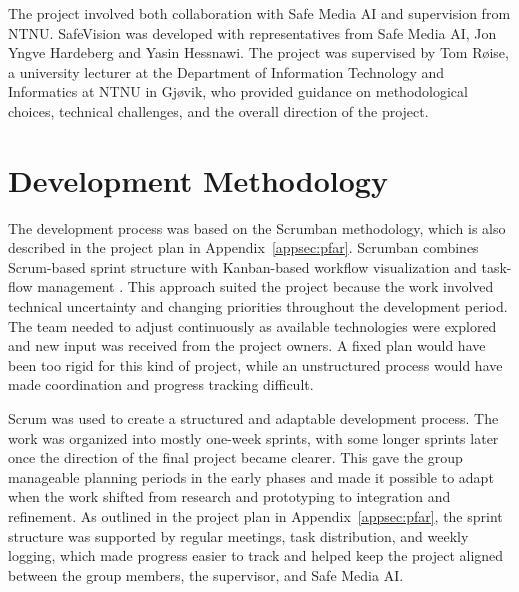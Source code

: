 The project involved both collaboration with Safe Media AI and supervision from NTNU. SafeVision was developed with representatives from Safe Media AI, Jon Yngve Hardeberg and Yasin Hessnawi. The project was supervised by Tom Røise, a university lecturer at the Department of Information Technology and Informatics at NTNU in Gjøvik, who provided guidance on methodological choices, technical challenges, and the overall direction of the project.






\section{Development Methodology}
\label{sec:project-team-and-methodology}

The development process was based on the Scrumban methodology, which is also described in the project plan in Appendix~\ref{appsec:pfar}. Scrumban combines Scrum-based sprint structure with Kanban-based workflow visualization and task-flow management \cite{bhavsar2020scrumban}. This approach suited the project because the work involved technical uncertainty and changing priorities throughout the development period. The team needed to adjust continuously as available technologies were explored and new input was received from the project owners. A fixed plan would have been too rigid for this kind of project, while an unstructured process would have made coordination and progress tracking difficult.

Scrum was used to create a structured and adaptable development process. The work was organized into mostly one-week sprints, with some longer sprints later once the direction of the final project became clearer. This gave the group manageable planning periods in the early phases and made it possible to adapt when the work shifted from research and prototyping to integration and refinement. As outlined in the project plan in Appendix~\ref{appsec:pfar}, the sprint structure was supported by regular meetings, task distribution, and weekly logging, which made progress easier to track and helped keep the project aligned between the group members, the supervisor, and Safe Media AI.

